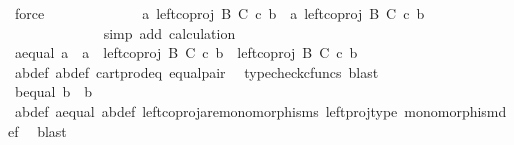 \begin{isabellebody}
\ force\isanewline
\ \ \ \ \ \ \ \ \ \ \isamarkupfalse%
\ \isamarkupfalse%
\ {\isachardoublequoteopen}{\isasymlangle}a{\isacharcomma}{\kern0pt}\ left{\isacharunderscore}{\kern0pt}coproj\ B\ C\ {\isasymcirc}\isactrlsub c\ b{\isasymrangle}\ {\isacharequal}{\kern0pt}\ {\isasymlangle}a{\isacharprime}{\kern0pt}{\isacharcomma}{\kern0pt}\ left{\isacharunderscore}{\kern0pt}coproj\ B\ C\ {\isasymcirc}\isactrlsub c\ b{\isacharprime}{\kern0pt}{\isasymrangle}{\isachardoublequoteclose}\isanewline
\ \ \ \ \ \ \ \ \ \ \ \ \isamarkupfalse%
\ {\isacharparenleft}{\kern0pt}simp\ add{\isacharcolon}{\kern0pt}\ calculation{\isacharparenright}{\kern0pt}\isanewline
\ \ \ \ \ \ \ \ \isamarkupfalse%
\isanewline
\ \ \ \ \ \ \ \ \isamarkupfalse%
\ \isamarkupfalse%
\ a{\isacharunderscore}{\kern0pt}equal{\isacharcolon}{\kern0pt}\ {\isachardoublequoteopen}a\ {\isacharequal}{\kern0pt}\ a{\isacharprime}{\kern0pt}\ {\isasymand}\ left{\isacharunderscore}{\kern0pt}coproj\ B\ C\ {\isasymcirc}\isactrlsub c\ b\ {\isacharequal}{\kern0pt}\ left{\isacharunderscore}{\kern0pt}coproj\ B\ C\ {\isasymcirc}\isactrlsub c\ b{\isacharprime}{\kern0pt}{\isachardoublequoteclose}\isanewline
\ \ \ \ \ \ \ \ \ \ \isamarkupfalse%
\ a{\isacharprime}{\kern0pt}b{\isacharprime}{\kern0pt}{\isacharunderscore}{\kern0pt}def\ ab{\isacharunderscore}{\kern0pt}def\ cart{\isacharunderscore}{\kern0pt}prod{\isacharunderscore}{\kern0pt}eq{}\ equal{\isacharunderscore}{\kern0pt}pair\ \isamarkupfalse%
\ {\isacharparenleft}{\kern0pt}typecheck{\isacharunderscore}{\kern0pt}cfuncs{\isacharcomma}{\kern0pt}\ blast{\isacharparenright}{\kern0pt}\isanewline
\ \ \ \ \ \ \ \ \isamarkupfalse%
\ \isamarkupfalse%
\ b{\isacharunderscore}{\kern0pt}equal{\isacharcolon}{\kern0pt}\ {\isachardoublequoteopen}b\ {\isacharequal}{\kern0pt}\ b{\isacharprime}{\kern0pt}{\isachardoublequoteclose}\isanewline
\ \ \ \ \ \ \ \ \ \ \isamarkupfalse%
\ a{\isacharprime}{\kern0pt}b{\isacharprime}{\kern0pt}{\isacharunderscore}{\kern0pt}def\ a{\isacharunderscore}{\kern0pt}equal\ ab{\isacharunderscore}{\kern0pt}def\ left{\isacharunderscore}{\kern0pt}coproj{\isacharunderscore}{\kern0pt}are{\isacharunderscore}{\kern0pt}monomorphisms\ left{\isacharunderscore}{\kern0pt}proj{\isacharunderscore}{\kern0pt}type\ monomorphism{\isacharunderscore}{\kern0pt}def{}\ \isamarkupfalse%
\ blast\isanewline
\ \ \ \ \ \ \ \ \isamarkupfalse%
\ \isamarkupfalse%

\end{isabellebody}
